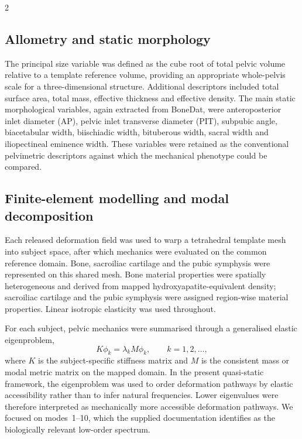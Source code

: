 \documentclass[openacc]{rsproca_new}
\begin{document}
\begin{multicols}{2}
\subsection{Allometry and static morphology}

The principal size variable was defined as the cube root of total pelvic volume relative to a template reference volume, providing an appropriate whole-pelvis scale for a three-dimensional structure. Additional descriptors included total surface area, total mass, effective thickness and effective density. The main static morphological variables, again extracted from BoneDat, were anteroposterior inlet diameter (AP), pelvic inlet transverse diameter (PIT), subpubic angle, biacetabular width, biischiadic width, bituberous width, sacral width and iliopectineal eminence width. These variables were retained as the conventional pelvimetric descriptors against which the mechanical phenotype could be compared.

\subsection{Finite-element modelling and modal decomposition}

Each released deformation field was used to warp a tetrahedral template mesh into subject space, after which mechanics were evaluated on the common reference domain. Bone, sacroiliac cartilage and the pubic symphysis were represented on this shared mesh. Bone material properties were spatially heterogeneous and derived from mapped hydroxyapatite-equivalent density; sacroiliac cartilage and the pubic symphysis were assigned region-wise material properties. Linear isotropic elasticity was used throughout.

For each subject, pelvic mechanics were summarised through a generalised elastic eigenproblem,
\begin{equation}
K\phi_{k} = \lambda_{k} M\phi_{k}, \qquad k=1,2,\ldots,
\end{equation}
where $K$ is the subject-specific stiffness matrix and $M$ is the consistent mass or modal metric matrix on the mapped domain. In the present quasi-static framework, the eigenproblem was used to order deformation pathways by elastic accessibility rather than to infer natural frequencies. Lower eigenvalues were therefore interpreted as mechanically more accessible deformation pathways. We focused on modes~1--10, which the supplied documentation identifies as the biologically relevant low-order spectrum.


\end{multicols}
\end{document}
